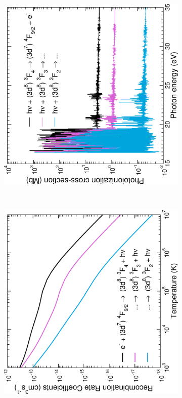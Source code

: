 %
\begin{figure}
\centering
\begin{subfigure}{0.45\textwidth}
\includegraphics[scale=0.5, angle=-90]{Figures/Cobalt/recomb/recomb_photo.eps}    \end{subfigure}
    ~ %
    \begin{subfigure}{0.45\textwidth}
\includegraphics[scale=0.5, angle=-90]{Figures/Cobalt/recomb/total.eps}

\end{subfigure}
\end{figure}
